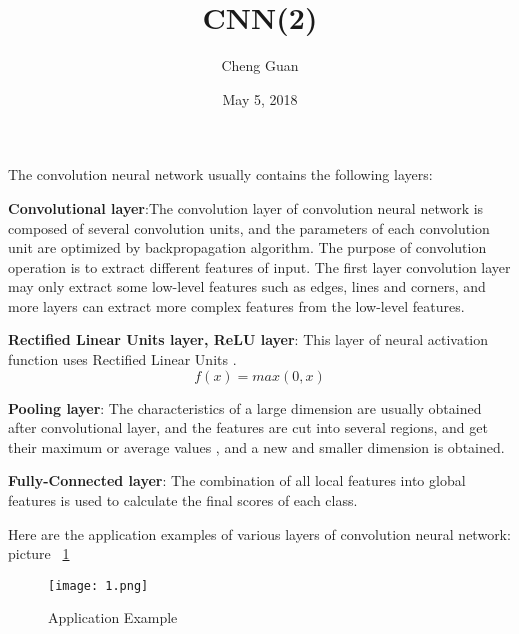 \documentclass[12pt]{article}
\begin{document}
\title{CNN(2)}
\author{Cheng Guan}
\date{May 5, 2018}
\maketitle
\setlength{\baselineskip}{20pt}

  The convolution neural network usually contains the following layers:

  \textbf{Convolutional layer}:The convolution layer of convolution neural network is composed of
 several convolution units, and the parameters of each convolution unit are optimized by backpropagation algorithm.
  The purpose of convolution operation is to extract different features of input.
  The first layer convolution layer may only extract some low-level features such as edges, lines and corners,
  and more layers can extract more complex features from the low-level features.

  \textbf{Rectified Linear Units layer, ReLU layer}:
  This layer of neural activation function  uses Rectified Linear Units .
  \begin{equation}
    f(x)=max(0,x)
  \end{equation}

  \textbf{Pooling layer}:
  The characteristics of a large dimension are usually obtained after convolutional layer,
   and the features are cut into several regions, and get their maximum or average values ,
   and a new and smaller dimension is obtained.

  \textbf{Fully-Connected layer}:
  The combination of all local features into global features
  is used to calculate the final scores of each class.\cite{test2}

  Here are the application examples of various layers of convolution neural network: picture ~\ref{fig1}

  \begin{figure}[htbp]
  \centering
  \texttt{[image: 1.png]}\\
  \caption{Application Example}\label{fig1}
 \end{figure}



\end{document}
